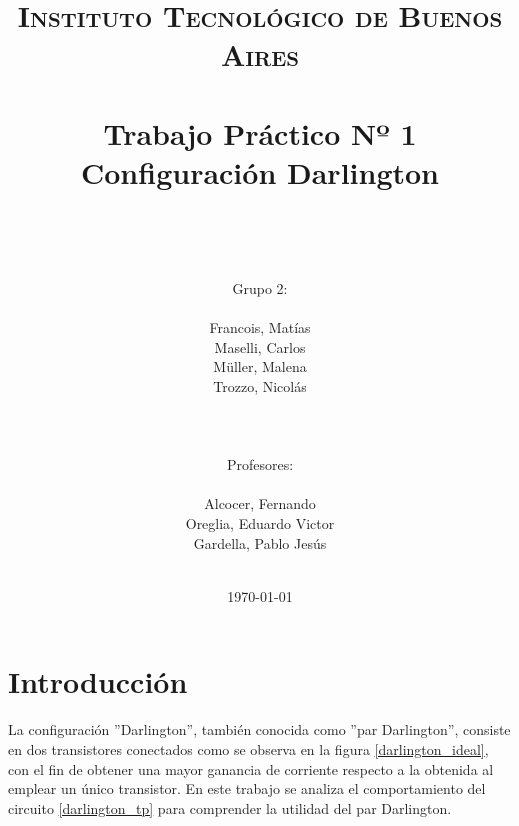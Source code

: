



\title{
	\normalfont \normalsize \textsc{Instituto Tecnol\'ogico de Buenos Aires} \\ [25pt]
	\horrule{2pt} \\[0.4cm]
	\huge Trabajo Pr\'actico Nº 1\\ Configuraci\'on Darlington \\
	\horrule{2pt} \\[0cm]
\author{\\Grupo 2:\\\\Francois, Mat\'ias\\Maselli, Carlos\\ M\"uller, Malena\\ Trozzo, Nicol\'as\\ \\ \\ \\
Profesores: \\\\ Alcocer, Fernando\\ Oreglia, Eduardo Victor \\Gardella, Pablo Jes\'us\\ \\ } 
}
\date{\today} 

\maketitle
\newpage

\section{Introducci\'on}

La configuraci\'on ''Darlington'', tambi\'en conocida como ''par Darlington'', consiste en dos transistores conectados como se observa en la figura \ref{darlington_ideal}, con el fin de obtener una mayor ganancia de corriente respecto a la obtenida al emplear un \'unico transistor. En este trabajo se analiza el comportamiento del circuito \ref{darlington_tp} para comprender la utilidad del par Darlington.

